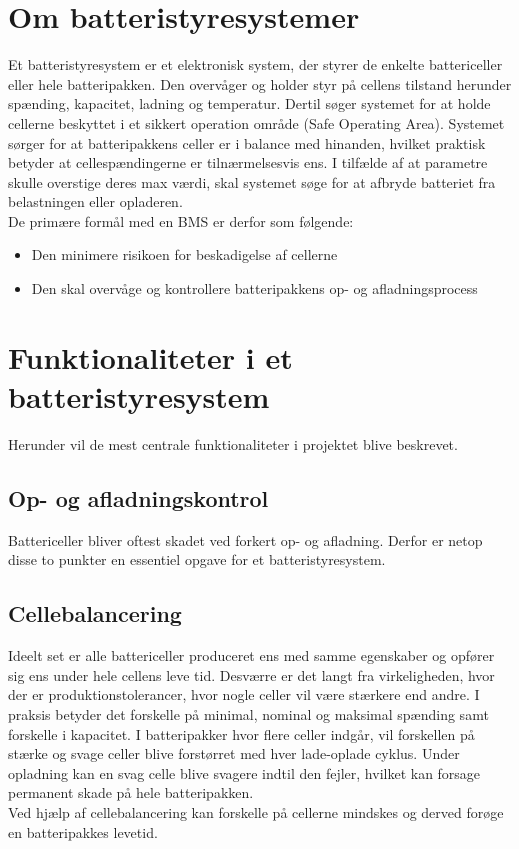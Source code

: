 \section{Om batteristyresystemer}
Et batteristyresystem er et elektronisk system, der styrer de enkelte battericeller eller hele batteripakken. Den overvåger og holder styr på cellens tilstand herunder spænding, kapacitet, ladning og temperatur. Dertil søger systemet for at holde cellerne beskyttet i et sikkert operation område (Safe Operating Area). Systemet sørger for at batteripakkens celler er i balance med hinanden, hvilket praktisk betyder at cellespændingerne er tilnærmelsesvis ens. I tilfælde af at parametre skulle overstige deres max værdi, skal systemet søge for at afbryde batteriet fra belastningen eller opladeren.
\\

De primære formål med en BMS er derfor som følgende:
\begin{itemize}[noitemsep]
	\item Den minimere risikoen for beskadigelse af cellerne
	\item Den skal overvåge og kontrollere batteripakkens op- og afladningsprocess
\end{itemize}


\section{Funktionaliteter i et batteristyresystem}
Herunder vil de mest centrale funktionaliteter i projektet blive beskrevet.

\subsection{Op- og afladningskontrol}
Battericeller bliver oftest skadet ved forkert op- og afladning. Derfor er netop disse to punkter en essentiel opgave for et batteristyresystem.

\subsection{Cellebalancering}
Ideelt set er alle battericeller produceret ens med samme egenskaber og opfører sig ens under hele cellens leve tid. Desværre er det langt fra virkeligheden, hvor der er produktionstolerancer, hvor nogle celler vil være stærkere end andre. I praksis betyder det forskelle på minimal, nominal og maksimal spænding samt forskelle i kapacitet. I batteripakker hvor flere celler indgår, vil forskellen på stærke og svage celler blive forstørret med hver lade-oplade cyklus. Under opladning kan en svag celle blive svagere indtil den fejler, hvilket kan forsage permanent skade på hele batteripakken.
\\
Ved hjælp af cellebalancering kan forskelle på cellerne mindskes og derved forøge en batteripakkes levetid.

